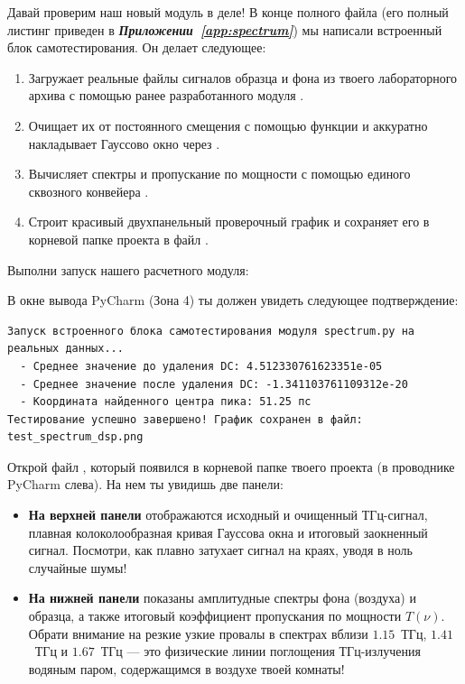 Давай проверим наш новый модуль  в деле! В конце полного файла (его полный листинг приведен в \textbf{\textit{Приложении~\ref{app:spectrum}}}) мы написали встроенный блок самотестирования. Он делает следующее:
\begin{enumerate}
    \item Загружает реальные файлы сигналов образца и фона из твоего лабораторного архива с помощью ранее разработанного модуля .
    \item Очищает их от постоянного смещения с помощью функции  и аккуратно накладывает Гауссово окно через .
    \item Вычисляет спектры и пропускание по мощности с помощью единого сквозного конвейера .
    \item Строит красивый двухпанельный проверочный график и сохраняет его в корневой папке проекта в файл .
\end{enumerate}

Выполни запуск нашего расчетного модуля:

В окне вывода PyCharm (Зона 4) ты должен увидеть следующее подтверждение:
\begin{verbatim}
Запуск встроенного блока самотестирования модуля spectrum.py на реальных данных...
  - Среднее значение до удаления DC: 4.512330761623351e-05
  - Среднее значение после удаления DC: -1.341103761109312e-20
  - Координата найденного центра пика: 51.25 пс
Тестирование успешно завершено! График сохранен в файл: test_spectrum_dsp.png
\end{verbatim}


Открой файл , который появился в корневой папке твоего проекта (в проводнике PyCharm слева). На нем ты увидишь две панели:
\begin{itemize}
    \item \textbf{На верхней панели} отображаются исходный и очищенный ТГц-сигнал, плавная колоколообразная кривая Гауссова окна и итоговый заокненный сигнал. Посмотри, как плавно затухает сигнал на краях, уводя в ноль случайные шумы!
    \item \textbf{На нижней панели} показаны амплитудные спектры фона (воздуха) и образца, а также итоговый коэффициент пропускания по мощности $T(\nu)$. Обрати внимание на резкие узкие провалы в спектрах вблизи $1.15$~ТГц, $1.41$~ТГц и $1.67$~ТГц --- это физические линии поглощения ТГц-излучения водяным паром, содержащимся в воздухе твоей комнаты!
\end{itemize}

